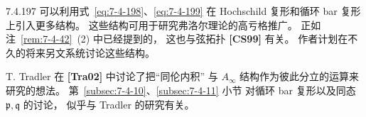 \begin{remark}{7.4.197}
可以利用式~\eqref{eq:7-4-198}、\eqref{eq:7-4-199}
在 Hochschild 复形和循环 bar 复形上引入更多结构。
这些结构可用于研究弗洛尔理论的高亏格推广。
正如注~\ref{rem:7-4-42}~\textup{(2)} 中已经提到的，
这也与弦拓扑 \textbf{[CS99]} 有关。
作者计划在不久的将来另文系统讨论这些结构。

T. Tradler 在 \textbf{[Tra02]} 中讨论了把“同伦内积”
与 $A_\infty$ 结构作为彼此分立的运算来研究的想法。
第~\ref{subsec:7-4-10}、\ref{subsec:7-4-11} 小节
对循环 bar 复形以及同态 $\mathfrak p,\mathfrak q$ 的讨论，
似乎与 Tradler 的研究有关。
\end{remark}
